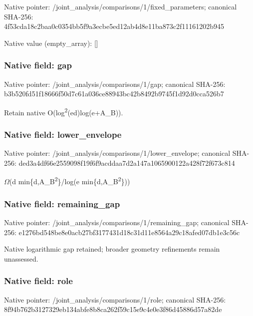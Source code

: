 \documentclass[10pt,a4paper]{article}
\begin{document}
Native pointer: /joint\_analysis/comparis\allowbreak{}ons/1/fixed\_parameters; canonical SHA-256: 4f53cda18c2baa0c0354bb5f\allowbreak{}9a3ecbe5ed12ab4d8e11ba87\allowbreak{}3c2f11161202b945



Native value (empty\_array): []



\subsubsection{Native field: gap}


Native pointer: /joint\_analysis/comparisons/1/gap; canonical SHA-256: b3b520fd51f18666f50d7c61\allowbreak{}a036ce88943bc42b8492b974\allowbreak{}5f1d92d0cca526b7


Retain native O(log\textsuperscript{2}(ed)log(e+A\_B)).


\subsubsection{Native field: lower\_envelope}


Native pointer: /joint\_analysis/comparis\allowbreak{}ons/1/lower\_envelope; canonical SHA-256: ded3a4df66e2559098f19f6f\allowbreak{}9acddaa7d2a147a106590012\allowbreak{}2a428f72f673c814


\ensuremath{\Omega}(d min\{d,A\_B\textsuperscript{2}\}/log(e min\{d,A\_B\textsuperscript{2}\}))


\subsubsection{Native field: remaining\_gap}


Native pointer: /joint\_analysis/comparis\allowbreak{}ons/1/remaining\_gap; canonical SHA-256: e1276bd548be8e0acb27bf31\allowbreak{}77431d18c31d11e8564a29c1\allowbreak{}8afed07db1e3c56c


Native logarithmic gap retained; broader geometry refinements remain unassessed.


\subsubsection{Native field: role}


Native pointer: /joint\_analysis/comparisons/1/role; canonical SHA-256: 8f94b762b3127329eb134abf\allowbreak{}e8b8ca262f59c15e9c4e0e3f\allowbreak{}86d45886d57a82de
\end{document}
